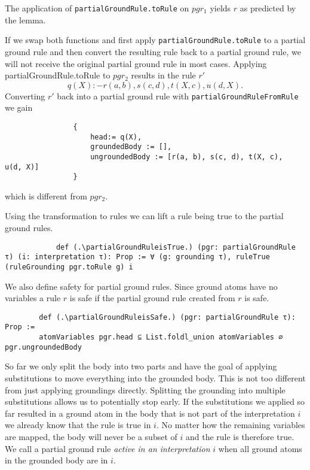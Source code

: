         \begin{example}
            The application of \texttt{partialGroundRule.toRule} on $pgr_1$ yields $r$ as predicted by the lemma.

            If we swap both functions and first apply \texttt{partialGroundRule.toRule} to a partial ground rule and then convert the resulting rule back to a partial ground rule, we will not receive the original partial ground rule in most cases. Applying {partialGroundRule.toRule} to $pgr_2$ results in the rule $r'$ \[q(X) :- r(a, b), s(c, d), t(X, c),  u(d, X) . \] Converting $r'$ back into a partial ground rule with \texttt{partialGroundRuleFromRule} we gain 

            \begin{lstlisting}
                {
                    head:= q(X),
                    groundedBody := [],
                    ungroundedBody := [r(a, b), s(c, d), t(X, c),  u(d, X)]
                }
            \end{lstlisting}
            which is different from $pgr_2$.
        \end{example}

        Using the transformation to rules we can lift a rule being true to the partial ground rules.

        \begin{lstlisting}
            def (.\partialGroundRuleisTrue.) (pgr: partialGroundRule τ) (i: interpretation τ): Prop := ∀ (g: grounding τ), ruleTrue (ruleGrounding pgr.toRule g) i
        \end{lstlisting}

        We also define safety for partial ground rules. Since ground atoms have no variables a rule $r$ is safe if the partial ground rule created from $r$ is safe.

        \begin{lstlisting}     
        def (.\partialGroundRuleisSafe.) (pgr: partialGroundRule τ): Prop :=
        atomVariables pgr.head ⊆ List.foldl_union atomVariables ∅ pgr.ungroundedBody
        \end{lstlisting}

        So far we only split the body into two parts and have the goal of applying substitutions to move everything into the grounded body. This is not too different from just applying groundings directly. 
        Splitting the grounding into multiple substitutions allows us to potentially stop early. If the substitutions we applied so far resulted in a ground atom in the body that is not part of the interpretation $i$ we already know that the rule is true in $i$. No matter how the remaining variables are mapped, the body will never be a subset of $i$ and the rule is therefore true. We call a partial ground rule \textit{active in an interpretation} $i$ when all ground atoms in the grounded body are in $i$.


